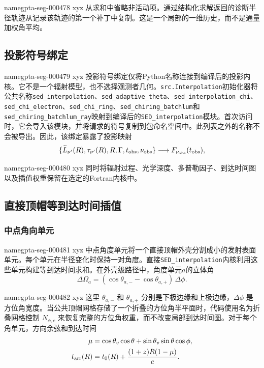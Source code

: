 \documentclass[twocolumn]{aastex702}
\makeatletter
\providecommand{\gptareaderanchor}[1]{\pdfdest name{#1} xyz}%
\providecommand{\gptareaderanchor}[1]{\special{pdf:dest (#1) [ @thispage /XYZ @xpos @ypos null ]}}%
\makeatother
\begin{document}
\gptareaderanchor{gpta-seg-000478}%
从求和中省略非活动项。通过结构化求解返回的诊断半径轨迹从记录该轨迹的第一个补丁中复制。这是一个局部的一维历史，而不是通量加权角平均。

\subsection{投影符号绑定}


\gptareaderanchor{gpta-seg-000479}%
投影符号绑定仅将Python名称连接到编译后的投影内核。它不是一个辐射模型，也不选择观测者几何。\texttt{src.Interpolation}初始化器将公共名称\texttt{sed\_interpolation}、\texttt{sed\_adaptive\_theta}、\texttt{sed\_interpolation\_chi}、\texttt{sed\_chi\_electron}、\texttt{sed\_chi\_ring}、\texttt{sed\_chiring\_batchlum}和\texttt{sed\_chiring\_batchlum\_ray}映射到编译后的\texttt{SED\_interpolation}模块。首次访问时，它会导入该模块，并将请求的符号复制到包命名空间中。此列表之外的名称不会被导出。因此，该绑定暴露了投影映射
\begin{equation}
\{\widetilde L_{\nu'}(R),\tau_{\nu'}(R),R,\Gamma,t_{\rm obs},\nu_{\rm obs}\}
\longrightarrow F_{\nu_{\rm obs}}(t_{\rm obs}),
\end{equation}

\gptareaderanchor{gpta-seg-000480}%
同时将辐射过程、光学深度、多普勒因子、到达时间图以及插值权重保留在选定的Fortran内核中。

\subsection{直接顶帽等到达时间插值}

\subsubsection{中点角向单元}


\gptareaderanchor{gpta-seg-000481}%
中点角度单元将一个直接顶帽外壳分割成小的发射表面单元。每个单元在半径变化时保持一对角度。直接\texttt{SED\_interpolation}内核利用这些单元构建等到达时间求和。在外壳级路径中，角度单元\(a\)的立体角
\begin{equation}
\Delta\Omega_a=
(\cos\theta_{a,-}-\cos\theta_{a,+})\,\Delta\phi .
\end{equation}

\gptareaderanchor{gpta-seg-000482}%
这里 \(\theta_{a,-}\) 和 \(\theta_{a,+}\) 分别是下极边缘和上极边缘，\(\Delta\phi\) 是方位角宽度。当公共顶帽网格存储了一个折叠的方位角半平面时，代码使用名为折叠网格控制 \(N_{\phi,c}\) 来恢复完整的方位角权重，而不改变局部到达时间图。对于每个角单元，方向余弦和到达时间
\begin{equation}
\begin{aligned}
\mu&=\cos\theta_v\cos\theta+\sin\theta_v\sin\theta\cos\phi ,\\
t_{\rm arr}(R)&=t_0(R)+\frac{(1+z)R(1-\mu)}{c}.
\end{aligned}
\end{equation}
\end{document}
